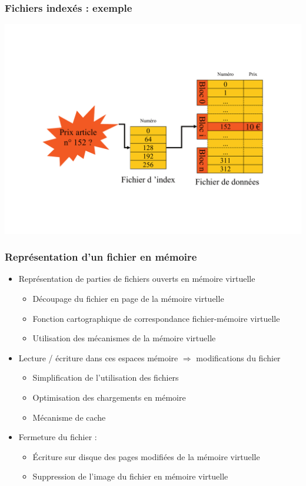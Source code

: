 \begin{frame}
\frametitle{Fichiers indexés : exemple}
\includegraphics[width=\textwidth]{../illustration/fichier_indexe_exemple.pdf}
\end{frame}



\begin{frame}
\frametitle{Représentation d'un fichier en mémoire}
\begin{itemize}
\item Représentation de parties de fichiers ouverts en mémoire virtuelle
\begin{itemize}
  \item Découpage du fichier en page de la mémoire virtuelle
  \item Fonction cartographique de correspondance fichier-mémoire virtuelle
  \item Utilisation des mécanismes de la mémoire virtuelle
\end{itemize}
\item Lecture / écriture dans ces espaces mémoire $\Longrightarrow$ modifications du fichier
\begin{itemize}
\item Simplification de l'utilisation des fichiers
\item Optimisation des chargements en mémoire
\item Mécanisme de cache
\end{itemize}
\item Fermeture du fichier :
\begin{itemize}
  \item Écriture sur disque des pages modifiées de la mémoire virtuelle
  \item Suppression de l'image du fichier en mémoire virtuelle
\end{itemize}
\end{itemize}
\end{frame}



